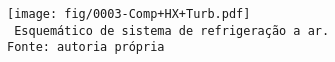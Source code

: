     \begin{frame}\vspace*{-0em}
        \begin{center}
            \begin{figure}
                \fontsize{5.0}{5}\selectfont
                \texttt{[image: fig/0003-Comp+HX+Turb.pdf]}
                \\\vspace*{-0.0em}\texttt{%
                    Esquemático de sistema de refrigeração a ar.\\
                    Fonte: autoria própria
                }
            \end{figure}
        \end{center}
    \end{frame}

    \begin{frame}\vspace*{-0em}
    \end{frame}

    \begin{frame}\vspace*{-0em}
    \end{frame}

    \begin{frame}\vspace*{-0em}
    \end{frame}

    \begin{frame}\vspace*{-0em}
    \end{frame}

